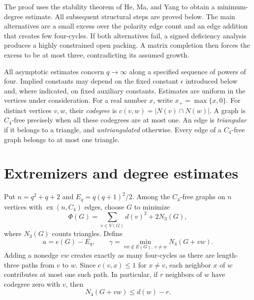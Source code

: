 \documentclass[11pt,reqno]{amsart}
\theoremstyle{definition}
\theoremstyle{remark}
\numberwithin{equation}{section}
\DeclareMathOperator{\ex}{ex}
\begin{document}
The proof uses the stability theorem of He, Ma, and Yang
\cite[Theorem~3.1]{hmy2023} to obtain a minimum-degree estimate.
All subsequent structural steps are proved below. The main alternatives
are a small excess over the polarity edge count and an edge addition
that creates few four-cycles. If both alternatives fail, a signed
deficiency analysis produces a highly constrained open packing.
A matrix completion then forces the excess to be at most three,
contradicting its assumed growth.

All asymptotic estimates concern $q\to\infty$ along a specified sequence
of powers of four. Implied constants may depend on the fixed constant
$\epsilon$ introduced below and, where indicated, on fixed auxiliary
constants. Estimates are uniform in the vertices under consideration.
For a real number $x$, write $x_+=\max\{x,0\}$.
For distinct vertices $v,w$, their \emph{codegree} is
$c(v,w)=|N(v)\cap N(w)|$. A graph is $C_4$-free precisely when all these
codegrees are at most one. An edge is \emph{triangular} if it belongs to
a triangle, and \emph{untriangulated} otherwise. Every edge of a
$C_4$-free graph belongs to at most one triangle.

\section{Extremizers and degree estimates}

Put $n=q^2+q+2$ and $E_q=q(q+1)^2/2$. Among the $C_4$-free graphs
on $n$ vertices with $\ex(n,C_4)$ edges, choose $G$ to minimize
\[
 \Phi(G)=\sum_{v\in V(G)}d(v)^2+2N_3(G),
\]
where $N_3(G)$ counts triangles. Define
\[
 a=e(G)-E_q,\qquad
 \gamma=\min_{vw\notin E(G),\ v\ne w}N_4(G+vw).
\]
Adding a nonedge $vw$ creates exactly as many four-cycles as there are
length-three paths from $v$ to $w$. Since $c(v,x)\le1$ for $x\ne v$,
each neighbor $x$ of $w$ contributes at most one such path.
In particular, if $r$ neighbors of $w$ have codegree zero with $v$, then
\begin{equation}\label{eq:path-bound}
 N_4(G+vw)\le d(w)-r.
\end{equation}
\end{document}
